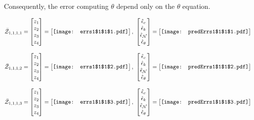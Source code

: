 \documentclass[12pt]{article}
\begin{document}
Consequently, the error computing $\theta$ depend only on the $\theta$  equation.  

\begin{gather*}
\bar{\mathcal{Z}}_{1,1,1,1}=\begin{bmatrix}
z_1\\
z_2\\
z_3\\
z_4
 \end{bmatrix}= \begin{bmatrix}
\vcenter{\hbox{\texttt{[image: errs1\$1\$1\$1.pdf]}}}
 \end{bmatrix},\,\, \begin{bmatrix}
\hat{\epsilon}_c\\\hat{\epsilon}_k\\\hat{\epsilon}_\mathcal{N}\\\hat{\epsilon}_\theta
 \end{bmatrix}=\begin{bmatrix}
\vcenter{\hbox{\texttt{[image: predErrs1\$1\$1\$1.pdf]}}}
 \end{bmatrix}
\end{gather*}


\begin{gather*}
\bar{\mathcal{Z}}_{1,1,1,2}=\begin{bmatrix}
z_1\\
z_2\\
z_3\\
z_4
 \end{bmatrix}= \begin{bmatrix}
\vcenter{\hbox{\texttt{[image: errs1\$1\$1\$2.pdf]}}}
 \end{bmatrix},\,\, \begin{bmatrix}
\hat{\epsilon}_c\\\hat{\epsilon}_k\\\hat{\epsilon}_\mathcal{N}\\\hat{\epsilon}_\theta
 \end{bmatrix}=\begin{bmatrix}
\vcenter{\hbox{\texttt{[image: predErrs1\$1\$1\$2.pdf]}}}
 \end{bmatrix}
\end{gather*}


\begin{gather*}
\bar{\mathcal{Z}}_{1,1,1,3}=\begin{bmatrix}
z_1\\
z_2\\
z_3\\
z_4
 \end{bmatrix}= \begin{bmatrix}
\vcenter{\hbox{\texttt{[image: errs1\$1\$1\$3.pdf]}}}
 \end{bmatrix},\,\, \begin{bmatrix}
\hat{\epsilon}_c\\\hat{\epsilon}_k\\\hat{\epsilon}_\mathcal{N}\\\hat{\epsilon}_\theta
 \end{bmatrix}=\begin{bmatrix}
\vcenter{\hbox{\texttt{[image: predErrs1\$1\$1\$3.pdf]}}}
 \end{bmatrix}
\end{gather*}
\end{document}
